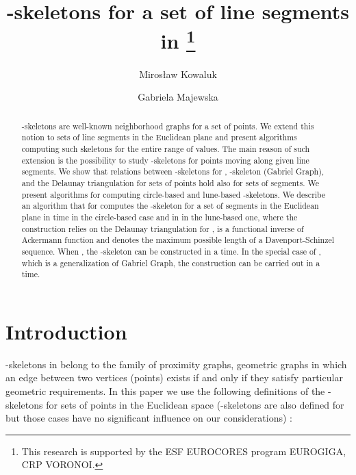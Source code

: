 \documentclass[11pt]{llncs}
\begin{document}
\title{-skeletons for a set of line segments in 
\thanks{This research is supported by the ESF EUROCORES program EUROGIGA, CRP VORONOI.}}
\author{
        Miros{\l}aw Kowaluk 
\and
                     Gabriela Majewska 
}
\date{}


\maketitle

\begin{abstract}
-skeletons are well-known neighborhood graphs for a set of points.  
We extend this notion to sets of line segments in the Euclidean plane 
and present algorithms computing such skeletons for the entire range of  values.
The main reason of such extension is the possibility to study -skeletons for points
moving along given line segments.
We show that relations between -skeletons for , -skeleton 
(Gabriel Graph), 
and the Delaunay triangulation for sets of points hold also for sets of segments.
We present algorithms for computing circle-based and lune-based -skeletons. 
We describe an algorithm that for  computes the -skeleton for a set  
of  segments in the Euclidean plane in  time 
in the circle-based case and in  in the lune-based one,
where the construction relies on the Delaunay triangulation for ,  is a functional inverse of Ackermann function and  denotes 
the maximum possible length of a  Davenport-Schinzel sequence.
When , the -skeleton can be constructed in a  time. 
In the special case of , which is a generalization of Gabriel Graph, 
the construction can be carried out in a  time.
\end{abstract}

\section{Introduction}
 
-skeletons in  belong to the family of proximity graphs, 
geometric graphs in which an edge between two vertices (points) exists 
if and only if they satisfy particular geometric requirements. 
In this paper we use the following 
definitions of the -skeletons for sets of points in the Euclidean space (-skeletons are also defined for  but those cases
have no significant influence on our considerations) :
\end{document}
